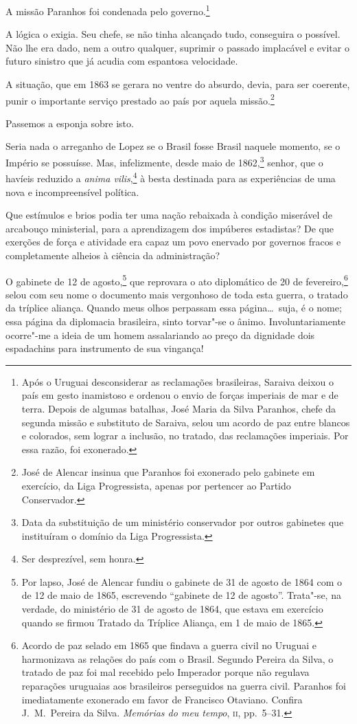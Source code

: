  A missão Paranhos foi condenada pelo
governo.\footnote{ Após o Uruguai desconsiderar as reclamações brasileiras, Saraiva 
deixou o país em gesto inamistoso e ordenou o envio de forças imperiais de mar e de terra. 
Depois de algumas batalhas, José Maria da Silva Paranhos, chefe da segunda missão e substituto 
de Saraiva, selou um acordo de paz entre blancos e colorados, sem lograr a inclusão, no tratado, 
das reclamações imperiais. Por essa razão, foi exonerado.}

 A lógica o exigia. Seu chefe, se não tinha alcançado tudo, conseguira o
possível. Não lhe era dado, nem a outro qualquer, suprimir o passado
implacável e evitar o futuro sinistro que já acudia com espantosa velocidade.

 A situação, que em 1863 se gerara no ventre do absurdo, devia, para ser
coerente, punir o importante serviço prestado ao país por aquela
missão.\footnote{ José de Alencar insinua que Paranhos foi exonerado pelo gabinete em exercício,
da Liga Progressista, apenas por pertencer ao Partido Conservador.}
 
 Passemos a esponja sobre isto.

 Seria nada o arreganho de Lopez se o Brasil fosse Brasil naquele
momento, se o Império se possuísse. Mas, infelizmente, desde maio de
1862,\footnote{ Data da substituição de um ministério conservador por outros gabinetes que
instituíram o domínio da Liga Progressista.}
 senhor, que o havíeis reduzido a \textit{anima vilis},\footnote{ Ser
desprezível, sem honra.}  à besta destinada para as experiências 
de uma nova e incompreensível política.

 Que estímulos e brios podia ter uma nação rebaixada à condição
miserável de arcabouço ministerial, para a aprendizagem dos impúberes
estadistas? De que exerções de força e atividade era capaz um povo
enervado por governos fracos e completamente alheios à ciência da administração?

 O gabinete de 12 de agosto,\footnote{ \label{gale}Por lapso, José de Alencar fundiu o gabinete 
de 31 de agosto de 1864 com o
de 12 de maio de 1865, escrevendo ``gabinete de 12 de agosto''.
Trata"-se, na verdade, do ministério de 31 de agosto de 1864, que
estava em exercício quando se firmou Tratado da Tríplice Aliança, em 1
de maio de 1865.}  que reprovara o ato diplomático de 20 de
fevereiro,\footnote{ Acordo de paz selado em 1865 que findava a guerra civil no Uruguai e
harmonizava as relações do país com o Brasil. Segundo Pereira da Silva,
o tratado de paz foi mal recebido pelo Imperador porque não regulava
reparações uruguaias aos brasileiros perseguidos na guerra civil.
Paranhos foi imediatamente exonerado em favor de Francisco Otaviano.
Confira J.~M.~Pereira da Silva. \textit{Memórias do meu tempo}, \textsc{ii}, pp.~5--31.}
 selou com seu nome o documento mais vergonhoso de toda esta guerra, o
tratado da tríplice aliança. Quando meus olhos perpassam essa página\ldots\
suja, é o nome; essa página da diplomacia brasileira, sinto torvar"-se
o ânimo. Involuntariamente ocorre"-me a ideia de um homem assalariando
ao preço da dignidade dois espadachins para instrumento de sua vingança!


